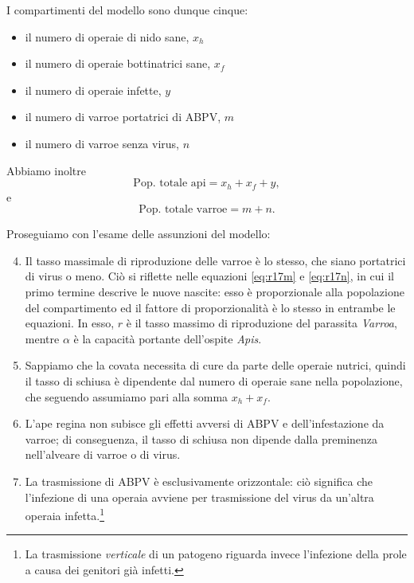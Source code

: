 I compartimenti del modello sono dunque cinque:
\begin{itemize}
    \item il numero di operaie di nido sane, $x_h$
    \item il numero di operaie bottinatrici sane, $x_f$
    \item il numero di operaie infette, $y$
    \item il numero di varroe portatrici di ABPV, $m$
    \item il numero di varroe senza virus, $n$
\end{itemize}

Abbiamo inoltre
$$\text{Pop. totale api} = x_h + x_f + y,$$
e
$$\text{Pop. totale varroe} = m + n.$$

Proseguiamo con l'esame delle assunzioni del modello:
\begin{enumerate}
    \setcounter{enumi}{3}
    \item Il tasso massimale di riproduzione delle varroe è lo stesso, che siano portatrici di virus o meno.
    Ciò si riflette nelle equazioni \eqref{eq:r17m} e \eqref{eq:r17n}, in cui il primo termine descrive le nuove nascite: esso è proporzionale alla popolazione del compartimento ed il fattore di proporzionalità è lo stesso in entrambe le equazioni. In esso, $r$ è il tasso massimo di riproduzione del parassita \emph{Varroa}, mentre $\alpha$ è la capacità portante dell'ospite \emph{Apis}.
    \item Sappiamo che la covata necessita di cure da parte delle operaie nutrici, quindi il tasso di schiusa è dipendente dal numero di operaie sane nella popolazione, che seguendo \cite{khoury2011} assumiamo pari alla somma $x_h + x_f$.
    \item L'ape regina non subisce gli effetti avversi di ABPV e dell'infestazione da varroe; di conseguenza, il tasso di schiusa non dipende dalla preminenza nell'alveare di varroe o di virus.
    \item La trasmissione di ABPV è esclusivamente orizzontale: ciò significa che l'infezione di una operaia avviene per trasmissione del virus da un'altra operaia infetta.\footnote{La trasmissione \emph{verticale} di un patogeno riguarda invece l'infezione della prole a causa dei genitori già infetti.}


\end{enumerate}
